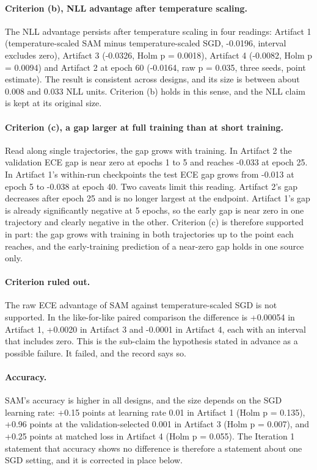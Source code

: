 \documentclass[11pt,letterpaper]{article}
\begin{document}
\paragraph{Criterion (b), NLL advantage after temperature scaling.} The NLL advantage persists after temperature scaling in four readings: Artifact 1 (temperature-scaled SAM minus temperature-scaled SGD, -0.0196, interval excludes zero), Artifact 3 (-0.0326, Holm p = 0.0018), Artifact 4 (-0.0082, Holm p = 0.0094) and Artifact 2 at epoch 60 (-0.0164, raw p = 0.035, three seeds, point estimate). The result is consistent across designs, and its size is between about 0.008 and 0.033 NLL units. Criterion (b) holds in this sense, and the NLL claim is kept at its original size.

\paragraph{Criterion (c), a gap larger at full training than at short training.} Read along single trajectories, the gap grows with training. In Artifact 2 the validation ECE gap is near zero at epochs 1 to 5 and reaches -0.033 at epoch 25. In Artifact 1's within-run checkpoints the test ECE gap grows from -0.013 at epoch 5 to -0.038 at epoch 40. Two caveats limit this reading. Artifact 2's gap decreases after epoch 25 and is no longer largest at the endpoint. Artifact 1's gap is already significantly negative at 5 epochs, so the early gap is near zero in one trajectory and clearly negative in the other. Criterion (c) is therefore supported in part: the gap grows with training in both trajectories up to the point each reaches, and the early-training prediction of a near-zero gap holds in one source only.

\paragraph{Criterion ruled out.} The raw ECE advantage of SAM against temperature-scaled SGD is not supported. In the like-for-like paired comparison the difference is +0.00054 in Artifact 1, +0.0020 in Artifact 3 and -0.0001 in Artifact 4, each with an interval that includes zero. This is the sub-claim the hypothesis stated in advance as a possible failure. It failed, and the record says so.

\paragraph{Accuracy.} SAM's accuracy is higher in all designs, and the size depends on the SGD learning rate: +0.15 points at learning rate 0.01 in Artifact 1 (Holm p = 0.135), +0.96 points at the validation-selected 0.001 in Artifact 3 (Holm p = 0.007), and +0.25 points at matched loss in Artifact 4 (Holm p = 0.055). The Iteration 1 statement that accuracy shows no difference is therefore a statement about one SGD setting, and it is corrected in place below.
\end{document}
